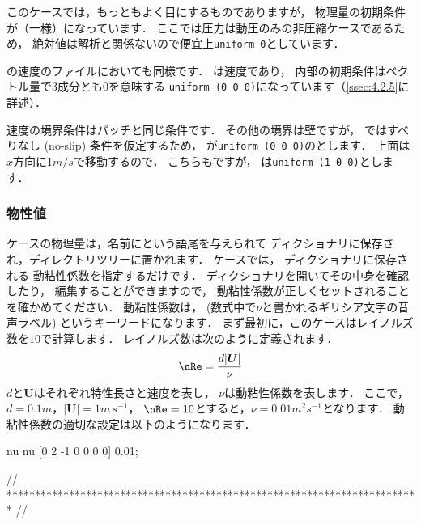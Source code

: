 このケースでは，もっともよく目にするものでありますが，
物理量の初期条件が（一様）になっています．
ここでは圧力は動圧のみの非圧縮ケースであるため，
絶対値は解析と関係ないので便宜上\texttt{uniform 0}としています．

の速度のファイルにおいても同様です．
は速度であり，
内部の初期条件はベクトル量で3成分とも$0$を意味する
\texttt{uniform (0 0 0)}になっています（\autoref{ssec:4.2.5}に詳述）．

速度の境界条件はパッチと同じ条件です．
その他の境界は壁ですが，
ではすべりなし (no-slip) 条件を仮定するため，
%
%
が\texttt{uniform (0 0 0)}のとします．
上面は$x$方向に$1\unit{m/s}$で移動するので，
こちらもですが，
は\texttt{uniform (1 0 0)}とします．

\subsubsection{物性値}
\label{sssec:2.1.1.3}
ケースの物理量は，名前にという語尾を与えられて
ディクショナリに保存され，ディレクトリツリーに置かれます．
%
%
ケースでは，
%
%
ディクショナリに保存される
動粘性係数を指定するだけです．
ディクショナリを開いてその中身を確認したり，
編集することができますので，
%
動粘性係数が正しくセットされることを確かめてください．
動粘性係数は， (数式中で$\nu$と書かれるギリシア文字の音声ラベル)
というキーワードになります．
まず最初に，このケースはレイノルズ数を$10$で計算します．
%
レイノルズ数は次のように定義されます．
\begin{align}
 \label{eq:2.1}
 \nRe = \frac{d|\bm{U}|}{\nu}
\end{align}
$d$と$\bm{U}$はそれぞれ特性長さと速度を表し，
$\nu$は動粘性係数を表します．
ここで，$d = 0.1\unit{m}$，$|\bm{U}| = 1\unit{m\,s^{-1}}$，
$\nRe = 10$とすると，$\nu = 0.01\unit{m^{2}s^{-1}}$となります．
動粘性係数の適切な設定は以下のようになります．
\begin{OFverbatim}[file, linenum=17]

nu              nu [0 2 -1 0 0 0 0] 0.01;


// ************************************************************************* //
\end{OFverbatim}

